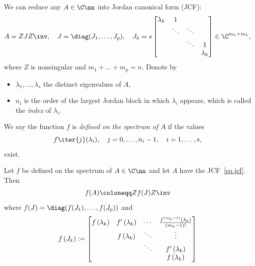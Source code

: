 \documentclass{article}
\begin{document}
We can reduce any $A\in\C\nn$ into Jordan canonical form (JCF):
    \begin{equation}\label{eq.jcf}
        A = Z J Z\inv, \quad J = \diag(J_1,\dots, J_p), \quad J_k =  s
        \begin{bmatrix}
            \lambda_k & 1 &  &  \\
            & \ddots & \ddots & \\
            & & \ddots & 1 \\ 
            & & & \lambda_k
        \end{bmatrix} \in \C^{m_k \times m_k},
    \end{equation}
where $Z$ is nonsingular and $m_1 + \dots + m_p = n$. Denote by 
\begin{itemize}
    \item $\lambda_1,\dots,\lambda_s$ the distinct eigenvalues of $A$,
    \item $n_i$ is the order of the largest Jordan block in which
    $\lambda_i$ appears, which is called the \emph{index} of
    $\lambda_i$. 
\end{itemize}
We say the function $f$ is \emph{defined on the spectrum of $A$} if the
values 
\begin{equation}\notag
    f\iter{j}(\lambda_i), \quad j = 0,\dots,n_i - 1,\quad i = 1,\dots,s,
\end{equation}
exist.

\begin{definition}
    \label{def.jcf} Let $f$ be defined
    on the spectrum of $A\in\C\nn$ and let $A$ have the
    JCF~\eqref{eq.jcf}. Then 
    \begin{equation}\notag
        f(A) \coloneqq Z f(J) Z\inv
    \end{equation}
    where $f(J) = \diag(f(J_1),\dots, f(J_p))$ and 
    \begin{equation}\notag
        f\left(J_k\right):=
        \begin{bmatrix}
            f\left(\lambda_k\right) & f^{\prime}\left(\lambda_k\right) & \cdots & \frac{f^{(m_k-1)}\left(\lambda_k\right)}{\left(m_k-1\right) !} \\
            & f\left(\lambda_k\right) & \ddots & \vdots \\
            & & \ddots & f^{\prime}\left(\lambda_k\right) \\
            & & & f\left(\lambda_k\right)
        \end{bmatrix}
    \end{equation}
\end{definition}
\end{document}
